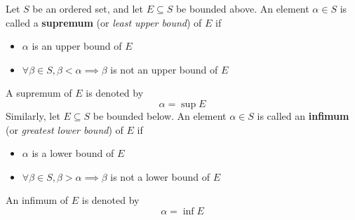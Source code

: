 \begin{definition} \label{an:def:supremum-infimum}
    Let $S$ be an ordered set, and let $E \subseteq S$ be bounded above.
    An element $\alpha \in S$ is called a \textbf{supremum} (or \emph{least upper bound}) of $E$ if
    \begin{itemize}
        \item $\alpha$ is an upper bound of $E$
        \item $\forall \beta \in S, \beta < \alpha \implies \beta$ is not an upper bound of $E$
    \end{itemize}
    A supremum of $E$ is denoted by
    \[
    \alpha = \sup E
    \]
    Similarly, let $E \subseteq S$ be bounded below.
    An element $\alpha \in S$ is called an \textbf{infimum} (or \emph{greatest lower bound}) of $E$ if
    \begin{itemize}
        \item $\alpha$ is a lower bound of $E$
        \item $\forall \beta \in S, \beta > \alpha \implies \beta$ is not a lower bound of $E$
    \end{itemize}
    An infimum of $E$ is denoted by
    \[
    \alpha = \inf E
    \]
\end{definition}
